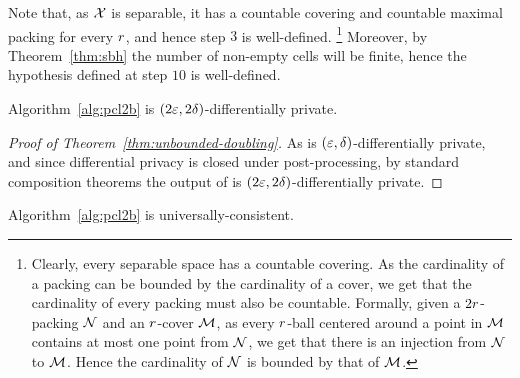\documentclass[12pt,a4paper,oneside,onecolumn]{book}
\begin{document}
Note that, as $\mathcal{X}$ is separable, it has a countable covering and countable maximal packing for every $r$, and hence step $3$ is well-defined. 
\footnote{Clearly, every separable space has a countable covering. As the cardinality of a packing can be bounded by the cardinality of a cover, we get that the cardinality of every packing  must also be countable. Formally, 
given a $2r$-packing $\mathcal{N}$ and an $r$-cover $\mathcal{M}$,
as every $r$-ball centered around a point in $\mathcal{M}$ contains at most one point from $\mathcal{N}$, we get that there is an injection from $\mathcal{N}$ to $\mathcal{M}$. Hence the cardinality of $\mathcal{N}$ is bounded by that of $\mathcal{M}$.}
Moreover, by Theorem~\ref{thm:sbh}
the number of non-empty cells will be finite, hence the hypothesis defined at step $10$ is well-defined.



\begin{theorem}
\label{thm:unbounded-doubling}
Algorithm~\ref{alg:pcl2b} is $(2\varepsilon,2\delta)$-differentially private.
\end{theorem}

\begin{proof}[Proof of Theorem~\ref{thm:unbounded-doubling}]
As  is $(\varepsilon,\delta)$-differentially private, 
and since differential privacy is closed under post-processing, by standard composition theorems the output of  is  $(2\varepsilon,2\delta)$-differentially private.
\end{proof}

\begin{theorem}
  Algorithm~\ref{alg:pcl2b} is universally-consistent. 
\end{theorem}
\end{document}
